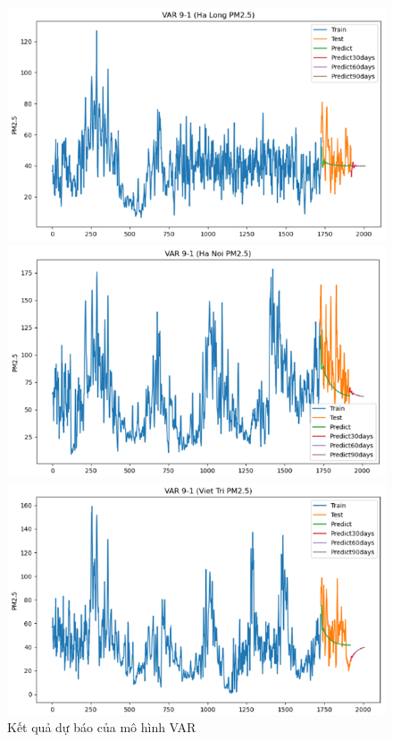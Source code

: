 \begin{figure}[H]
\begin{minipage}{0.15\textwidth}
        \end{minipage}
        \hfill
    \begin{minipage}{0.15\textwidth}
        \centering
        \includegraphics[width=1\textwidth]{img/final/VAR/90D/VAR_9_1_HL.png}
        \end{minipage}
        \hfill
        \begin{minipage}{0.15\textwidth}
        \centering
        \includegraphics[width=1\textwidth]{img/final/VAR/90D/VAR_9_1_HN.png}
        \end{minipage}
        \hfill
        \begin{minipage}{0.15\textwidth}
        \centering
        \includegraphics[width=1\textwidth]{img/final/VAR/90D/VAR_9_1_VT.png}
        \end{minipage}
        \hfill
    
    \caption{Kết quả dự báo của mô hình VAR}
    \label{fig:VAR}

\end{figure}
